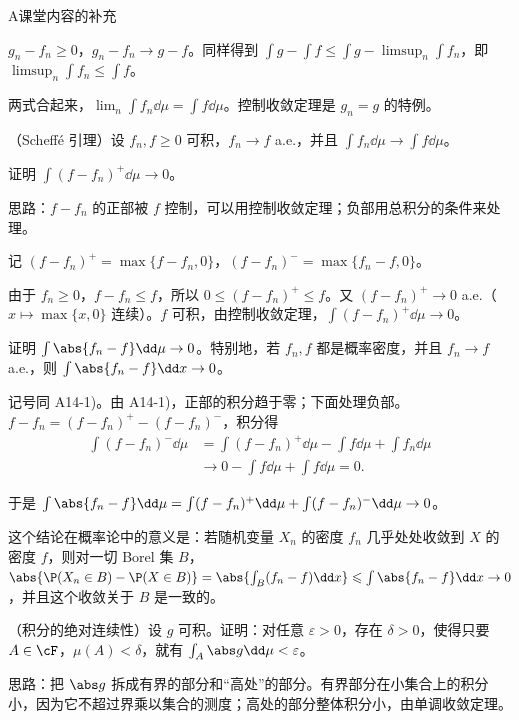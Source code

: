 \begin{exercises}{A}{课堂内容的补充}
\begin{solution}
$g_n-f_n\geqslant0$，$g_n-f_n\to g-f$。同样得到 $\int g-\int f\leqslant\int g-\limsup_n\int f_n$，即 $\limsup_n\int f_n\leqslant\int f$。

两式合起来，$\lim_n\int f_n\dd\mu=\int f\dd\mu$。控制收敛定理是 $g_n=g$ 的特例。
\end{solution}

\item\label{ex:integration:A14} （Scheffé 引理）设 $f_n,f\geqslant0$ 可积，$f_n\to f$ a.e.，并且 $\int f_n\dd\mu\to\int f\dd\mu$。
\begin{questions}
\item 证明 $\int(f-f_n)^+\dd\mu\to0$。
\begin{solution}
思路：$f-f_n$ 的正部被 $f$ 控制，可以用控制收敛定理；负部用总积分的条件来处理。

记 $(f-f_n)^+=\max\{f-f_n,0\}$，$(f-f_n)^-=\max\{f_n-f,0\}$。

由于 $f_n\geqslant0$，$f-f_n\leqslant f$，所以 $0\leqslant(f-f_n)^+\leqslant f$。又 $(f-f_n)^+\to0$ a.e.（$x\mapsto\max\{x,0\}$ 连续）。$f$ 可积，由控制收敛定理，$\int(f-f_n)^+\dd\mu\to0$。
\end{solution}
\item 证明 $\int\abs{f_n-f}\dd\mu\to0$。特别地，若 $f_n,f$ 都是概率密度，并且 $f_n\to f$ a.e.，则 $\int\abs{f_n-f}\dd x\to0$。
\begin{solution}
记号同 A14-1)。由 A14-1)，正部的积分趋于零；下面处理负部。$f-f_n=(f-f_n)^+-(f-f_n)^-$，积分得
\[
\begin{aligned}
\int(f-f_n)^-\dd\mu&=\int(f-f_n)^+\dd\mu-\int f\dd\mu+\int f_n\dd\mu\\
&\to0-\int f\dd\mu+\int f\dd\mu=0 .
\end{aligned}
\]

于是 $\int\abs{f_n-f}\dd\mu=\int(f-f_n)^+\dd\mu+\int(f-f_n)^-\dd\mu\to0$。

这个结论在概率论中的意义是：若随机变量 $X_n$ 的密度 $f_n$ 几乎处处收敛到 $X$ 的密度 $f$，则对一切 Borel 集 $B$，$\abs{\P(X_n\in B)-\P(X\in B)}=\abs{\int_B(f_n-f)\dd x}\leqslant\int\abs{f_n-f}\dd x\to0$，并且这个收敛关于 $B$ 是一致的。
\end{solution}
\end{questions}

\item\label{ex:integration:A15} （积分的绝对连续性）设 $g$ 可积。证明：对任意 $\varepsilon>0$，存在 $\delta>0$，使得只要 $A\in\cF$，$\mu(A)<\delta$，就有 $\int_A\abs g\dd\mu<\varepsilon$。
\begin{solution}
思路：把 $\abs g$ 拆成有界的部分和“高处”的部分。有界部分在小集合上的积分小，因为它不超过界乘以集合的测度；高处的部分整体积分小，由单调收敛定理。


\end{solution}
\end{exercises}
